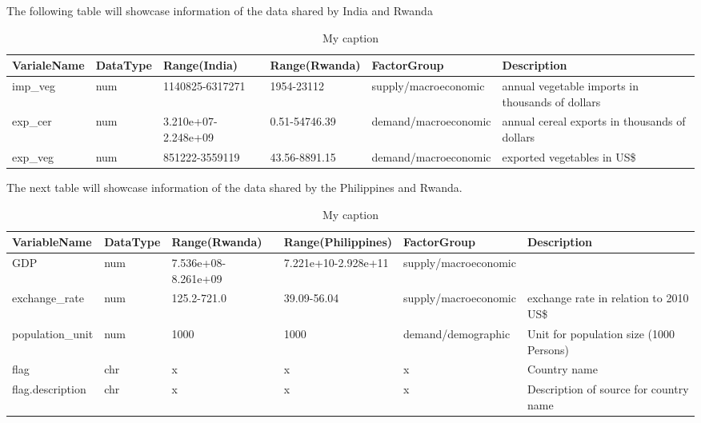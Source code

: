 \documentclass[12pt,a4paper,english]{article}
\begin{document}
The following table will showcase information of the data shared by India and Rwanda
\FloatBarrier
\begin{table}[!htbp]
\centering
\begin{adjustbox}{max width=\textwidth}
\begin{tabular}{llllll}
\hline
VarialeName & DataType & Range(India)        & Range(Rwanda) & FactorGroup          & Description                                      \\ \hline
imp\_veg    & num      & 1140825-6317271     & 1954-23112    & supply/macroeconomic & annual vegetable imports in thousands of dollars \\
exp\_cer    & num      & 3.210e+07-2.248e+09 & 0.51-54746.39 & demand/macroeconomic & annual cereal exports in thousands of dollars    \\
exp\_veg    & num      & 851222-3559119      & 43.56-8891.15 & demand/macroeconomic & exported vegetables in US\$    \\        \hline         
\end{tabular}
\end{adjustbox}
\caption{My caption}
\label{my-label}
\end{table}
\FloatBarrier

The next table will showcase information of the data shared by the Philippines and Rwanda.

\FloatBarrier
\begin{table}[!htbp]
\centering
\begin{adjustbox}{max width=\textwidth}
\begin{tabular}{llllll}
\hline
VariableName     & DataType & Range(Rwanda)       & Range(Philippines)  & FactorGroup          & Description                             \\ \hline
GDP              & num      & 7.536e+08-8.261e+09 & 7.221e+10-2.928e+11 & supply/macroeconomic &                                         \\
exchange\_rate   & num      & 125.2-721.0         & 39.09-56.04         & supply/macroeconomic & exchange rate in relation to 2010 US\$  \\
population\_unit & num      & 1000                & 1000                & demand/demographic   & Unit for population size (1000 Persons) \\
flag             & chr      & x                   & x                   & x                    & Country name                            \\
flag.description & chr      & x                   & x                   & x                    & Description of source for country name \\ \hline
\end{tabular}
\end{adjustbox}
\caption{My caption}
\label{my-label}
\end{table}
\FloatBarrier
\end{document}
